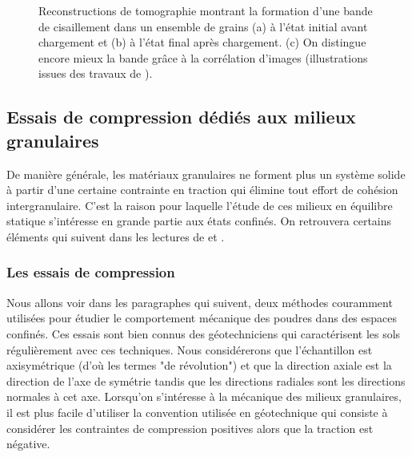 			\begin{figure}\centering
				\hspace{1.5cm}
				\hspace{1.5cm}
				\caption{\label{fig03:cisaillement}Reconstructions de tomographie montrant la formation d'une bande de cisaillement dans un ensemble de grains (a) à l'état initial avant chargement et (b) à l'état final après chargement. (c) On distingue encore mieux la bande grâce à la corrélation d'images (illustrations issues des travaux de  \cite{kawamoto_all_2018}).}
			\end{figure}
	\subsection{Essais de compression dédiés aux milieux granulaires}
		De manière générale, les matériaux granulaires ne forment plus un système solide à partir d'une certaine contrainte en traction qui élimine tout effort de cohésion intergranulaire. C'est la raison pour laquelle l'étude de ces milieux en équilibre statique s'intéresse en grande partie aux états confinés. On retrouvera certains éléments qui suivent dans les lectures de \citet{terzaghi_soil_1996} et \citet{bardet_experimental_1997}.
		\subsubsection{Les essais de compression}
			Nous allons voir dans les paragraphes qui suivent, deux méthodes couramment utilisées pour étudier le comportement mécanique des poudres dans des espaces confinés. Ces essais sont bien connus des géotechniciens qui caractérisent les sols régulièrement avec ces techniques. Nous considérerons que l'échantillon est axisymétrique (d'où les termes "de révolution") et que la direction axiale est la direction de l'axe de symétrie tandis que les directions radiales sont les directions normales à cet axe. Lorsqu'on s'intéresse à la mécanique des milieux granulaires, il est plus facile d'utiliser la convention utilisée en géotechnique qui consiste à considérer les contraintes de compression positives alors que la traction est négative.
